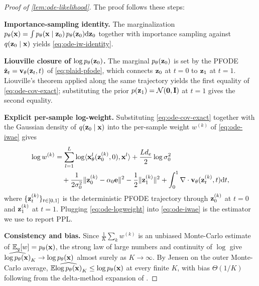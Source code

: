 \documentclass{article}
\begin{document}
\begin{proof}[Proof of \cref{lem:ode-likelihood}] The proof follows these steps:


\textbf{Importance-sampling identity.} The marginalization $p_\theta({\mathbf x}) = \int p_\theta({\mathbf x} \mid {\mathbf z}_0)\,p_\theta({\mathbf z}_0){\mathrm{d}}{\mathbf z}_0$ together with importance sampling against $q({\mathbf z}_0\mid{\mathbf x})$ yields \cref{eq:ode-iw-identity}.

\textbf{Liouville closure of $\log p_\theta({\mathbf z}_0)$.} The marginal $p_\theta({\mathbf z}_0)$ is set by the PFODE $\dot{{\mathbf z}}_t = {\mathbf v}_\theta({\mathbf z}_t, t)$ of \cref{eq:plaid-pfode}, which connects ${\mathbf z}_0$ at $t = 0$ to ${\mathbf z}_1$ at $t = 1$. Liouville's theorem applied along the same trajectory yields the first equality of \cref{eq:ode-cov-exact}; substituting the prior $p({\mathbf z}_1) = \mathcal{N}({\mathbf 0}, {\mathbf I})$ at $t = 1$ gives the second equality. %

\textbf{Explicit per-sample log-weight.} Substituting \cref{eq:ode-cov-exact} together with the Gaussian density of $q({\mathbf z}_0 \mid {\mathbf x})$ into the per-sample weight $w^{(k)}$ of \cref{eq:ode-iwae} gives
\begin{align}\label{eq:ode-logweight}
  \log w^{(k)}
  &= \sum_{l=1}^L \log\langle{\mathbf x}_\theta^l({\mathbf z}_0^{(k)},0), {\mathbf x}^l\rangle + \frac{Ld_e}{2}\log\sigma_0^2 \notag\\
  &\quad + \frac{1}{2\sigma_0^2}\|{\mathbf z}_0^{(k)}-\alpha_0{\mathbf e}\|^2 - \frac{1}{2}\|{\mathbf z}_1^{(k)}\|^2 + \int_0^1 \nabla\cdot {\mathbf v}_\theta({\mathbf z}_t^{(k)},t){\mathrm{d}} t,
\end{align}
where $\{{\mathbf z}_t^{(k)}\}_{t\in[0,1]}$ is the deterministic PFODE trajectory through ${\mathbf z}_0^{(k)}$ at $t=0$ and ${\mathbf z}_1^{(k)}$ at $t=1$. Plugging \cref{eq:ode-logweight} into \cref{eq:ode-iwae} is the estimator we use to report PPL.

\textbf{Consistency and bias.} Since $\frac{1}{K}\sum_k w^{(k)}$ is an unbiased Monte-Carlo estimate of $\mathbb{E}_q[w] = p_\theta({\mathbf x})$, the strong law of large numbers and continuity of $\log$ give $\widehat{\log p_\theta({\mathbf x})}_K \to \log p_\theta({\mathbf x})$ almost surely as $K\to\infty$. By Jensen on the outer Monte-Carlo average, $\mathbb{E}\widehat{\log p_\theta({\mathbf x})}_K \le \log p_\theta({\mathbf x})$ at every finite $K$, with bias $\Theta(1/K)$ following from the delta-method expansion of \citet{nowozin2018debiasing}.

%
%
%
%
%
%
%
%
%
%
%
%
%
%
%
%
\end{proof}


%
%
\end{document}
